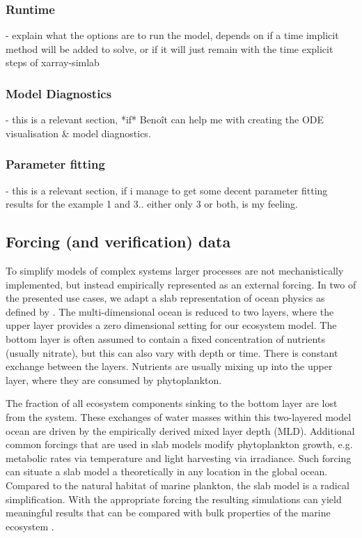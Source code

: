 \documentclass[template.tex]{subfiles}
\begin{document}
\subsubsection{Runtime}
- explain what the options are to run the model, depends on if a time implicit method will be added to solve, or if it will just remain with the time explicit steps of xarray-simlab

\subsubsection{Model Diagnostics}
- this is a relevant section, *if* Benoît can help me with creating the ODE visualisation & model diagnostics.

\subsubsection{Parameter fitting}
- this is a relevant section, if i manage to get some decent parameter fitting results for the example 1 and 3.. either only 3 or both, is my feeling. 


\subsection{Forcing (and verification) data} \label{Section:ForcingSection}

To simplify models of complex systems larger processes are not mechanistically implemented, but instead empirically represented as an external forcing. In two of the presented use cases, we adapt a slab representation of ocean physics as defined by \citet{Evans1985ACycles}. The multi-dimensional ocean is reduced to two layers, where the upper layer provides a zero dimensional setting for our ecosystem model. The bottom layer is often assumed to contain a fixed concentration of nutrients (usually nitrate), but this can also vary with depth or time. There is constant exchange between the layers. Nutrients are usually mixing up into the upper layer, where they are consumed by phytoplankton. 

The fraction of all ecosystem components sinking to the bottom layer are lost from the system. These exchanges of water masses within this two-layered model ocean are driven by the empirically derived mixed layer depth (MLD). Additional common forcings that are used in slab models modify phytoplankton growth, e.g. metabolic rates via temperature and light harvesting via irradiance. Such forcing can situate a slab model a theoretically in any location in the global ocean. Compared to the natural habitat of marine plankton, the slab model is a radical simplification. With the appropriate forcing the resulting simulations can yield meaningful results that can be compared with bulk properties of the marine ecosystem \cite[e.g.][]{Evans1985ACycles, Fasham1990a}. 
\end{document}
